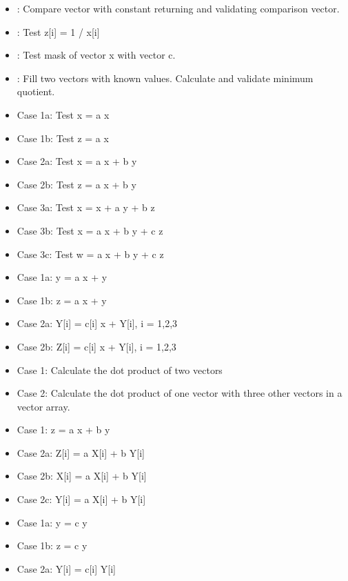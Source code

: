 \begin{itemize}
\item {}: Compare vector with constant returning and validating comparison vector.
\item {}: Test z[i] = 1 / x[i]
\item {}: Test mask of vector x with vector c.
\item {}: Fill two vectors with known values. Calculate and validate minimum quotient.
\item {} Case 1a: Test x = a x
\item {} Case 1b: Test z = a x
\item {} Case 2a: Test x = a x + b y
\item {} Case 2b: Test z = a x + b y
\item {} Case 3a: Test x = x + a y + b z
\item {} Case 3b: Test x = a x + b y + c z
\item {} Case 3c: Test w = a x + b y + c z
\item {} Case 1a: y = a x + y
\item {} Case 1b: z = a x + y
\item {} Case 2a: Y[i] = c[i] x + Y[i], i = 1,2,3
\item {} Case 2b: Z[i] = c[i] x + Y[i], i = 1,2,3
\item {} Case 1: Calculate the dot product of two vectors
\item {} Case 2: Calculate the dot product of one vector with three other vectors in a vector array.
\item {} Case 1: z = a x + b y
\item {} Case 2a: Z[i] = a X[i] + b Y[i]
\item {} Case 2b: X[i] = a X[i] + b Y[i]
\item {} Case 2c: Y[i] = a X[i] + b Y[i]
\item {} Case 1a: y = c y
\item {} Case 1b: z = c y
\item {} Case 2a: Y[i] = c[i] Y[i]

\end{itemize}
